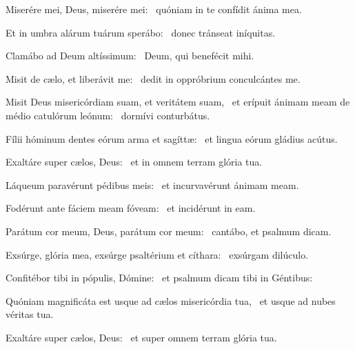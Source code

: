 \item Miserére mei, Deus, miserére mei:~\psstar{} quóniam in te confídit ánima mea.

\item Et in umbra alárum tuárum sperábo:~\psstar{} donec tránseat iníquitas.

\item Clamábo ad Deum altíssimum:~\psstar{} Deum, qui benefécit mihi.

\item Misit de cælo, et liberávit me:~\psstar{} dedit in oppróbrium conculcántes me.

\item Misit Deus misericórdiam suam, et veritátem suam,~\pscross{} et erípuit ánimam meam de médio catulórum leónum:~\psstar{} dormívi conturbátus.

\item Fílii hóminum dentes eórum arma et sagíttæ:~\psstar{} et lingua eórum gládius acútus.

\item Exaltáre super cælos, Deus:~\psstar{} et in omnem terram glória tua.

\item Láqueum paravérunt pédibus meis:~\psstar{} et incurvavérunt ánimam meam.

\item Fodérunt ante fáciem meam fóveam:~\psstar{} et incidérunt in eam.

\item Parátum cor meum, Deus, parátum cor meum:~\psstar{} cantábo, et psalmum dicam.

\item Exsúrge, glória mea, exsúrge psaltérium et cíthara:~\psstar{} exsúrgam dilúculo.

\item Confitébor tibi in pópulis, Dómine:~\psstar{} et psalmum dicam tibi in Géntibus:

\item Quóniam magnificáta est usque ad cælos misericórdia tua,~\psstar{} et usque ad nubes véritas tua.

\item Exaltáre super cælos, Deus:~\psstar{} et super omnem terram glória tua.


